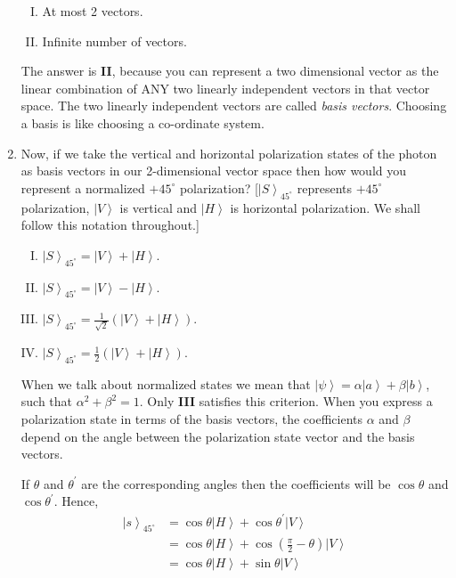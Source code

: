 \documentclass[12pt]{article}
\newcommand\half{\frac{1}{2}}
\newcommand\rr{\right \rangle}
\newcommand\ls{\left |}
\newcommand\tbf[1]{\textbf{#1}}
\begin{document}
\begin{enumerate}[1.]
\begin{enumerate}[I.]
 			\item At most 2 vectors.
 			\item Infinite number of vectors. \\ \newline
 		\end{enumerate}
 		The answer is \tbf{II}, because you can represent a two dimensional vector as the linear combination of ANY two linearly independent vectors in that vector space. The two linearly independent vectors are called \emph{basis vectors}. Choosing a basis is like choosing a co-ordinate system.
 	\item Now, if we take the vertical and horizontal polarization states of the photon as basis vectors in our 2-dimensional vector space then how would you represent a normalized $+45^\circ$ polarization? [$\ls S \rr _{45^\circ}$ represents $+45^\circ$ polarization, $\ls V \rr$ is vertical and $\ls H \rr$ is horizontal polarization. We shall follow this notation throughout.]
 		\begin{enumerate}[I.]
 			\item $\ls S \rr _{45^\circ} = \ls V \rr + \ls H \rr$.
 			\item $\ls S \rr _{45^\circ} = \ls V \rr - \ls H \rr$.
 			\item $\ls S \rr _{45^\circ} = \frac{1}{\sqrt{2}}\left( \ls V \rr + \ls H \rr \right)$.
 			\item $\ls S \rr _{45^\circ} = \half \left( \ls V \rr + \ls H \rr \right)$. \\ \newline
 		\end{enumerate}
 		When we talk about normalized states we mean that $\ls \psi \rr = \alpha \ls a \rr + \beta \ls b \rr$, such that $\alpha^2 + \beta^2 = 1$. Only \tbf{III} satisfies this criterion. When you express a polarization state in terms of the basis vectors, the coefficients $\alpha$ and $\beta$ depend on the angle between the polarization state vector and the basis vectors. \newpage
\rule{0pt}{20ex}
 		 If $\theta$ and $\theta^{'}$ are the corresponding angles then the coefficients will be $\cos{\theta}$ and $\cos{\theta^{'}}$. Hence,
 		 $$
 		 \begin{aligned}
 		 \ls s \rr _{45^\circ} &= \cos{\theta} \ls H \rr + \cos{\theta^{'}}\ls V \rr \\
 		 &= \cos{\theta} \ls H \rr + \cos\left({\frac{\pi}{2}-\theta}\right)\ls V \rr \\
 		 &= \cos{\theta} \ls H \rr + \sin{\theta}\ls V \rr
 		 \end{aligned}
 		 $$
 		 

\end{enumerate}
\end{document}
